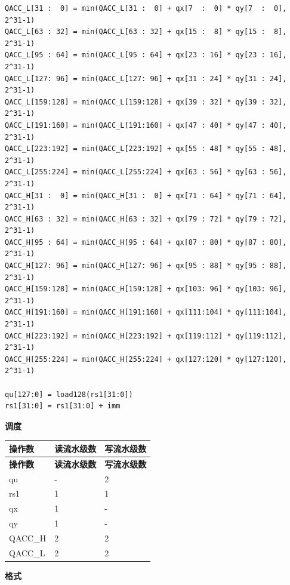 \begin{lstlisting}
QACC_L[31 :  0] = min(QACC_L[31 :  0] + qx[7  :  0] * qy[7  :  0], 2^31-1)
QACC_L[63 : 32] = min(QACC_L[63 : 32] + qx[15 :  8] * qy[15 :  8], 2^31-1)
QACC_L[95 : 64] = min(QACC_L[95 : 64] + qx[23 : 16] * qy[23 : 16], 2^31-1)
QACC_L[127: 96] = min(QACC_L[127: 96] + qx[31 : 24] * qy[31 : 24], 2^31-1)
QACC_L[159:128] = min(QACC_L[159:128] + qx[39 : 32] * qy[39 : 32], 2^31-1)
QACC_L[191:160] = min(QACC_L[191:160] + qx[47 : 40] * qy[47 : 40], 2^31-1)
QACC_L[223:192] = min(QACC_L[223:192] + qx[55 : 48] * qy[55 : 48], 2^31-1)
QACC_L[255:224] = min(QACC_L[255:224] + qx[63 : 56] * qy[63 : 56], 2^31-1)
QACC_H[31 :  0] = min(QACC_H[31 :  0] + qx[71 : 64] * qy[71 : 64], 2^31-1)
QACC_H[63 : 32] = min(QACC_H[63 : 32] + qx[79 : 72] * qy[79 : 72], 2^31-1)
QACC_H[95 : 64] = min(QACC_H[95 : 64] + qx[87 : 80] * qy[87 : 80], 2^31-1)
QACC_H[127: 96] = min(QACC_H[127: 96] + qx[95 : 88] * qy[95 : 88], 2^31-1)
QACC_H[159:128] = min(QACC_H[159:128] + qx[103: 96] * qy[103: 96], 2^31-1)
QACC_H[191:160] = min(QACC_H[191:160] + qx[111:104] * qy[111:104], 2^31-1)
QACC_H[223:192] = min(QACC_H[223:192] + qx[119:112] * qy[119:112], 2^31-1)
QACC_H[255:224] = min(QACC_H[255:224] + qx[127:120] * qy[127:120], 2^31-1)

qu[127:0] = load128(rs1[31:0])
rs1[31:0] = rs1[31:0] + imm
\end{lstlisting}

\textbf{调度}\\
\begin{longtable}[c]{|l|l|l|}
    \hline
    \rowcolor{lightgray}
    \textbf{操作数} & \textbf{读流水级数} & \textbf{写流水级数} \\\hline
    \endfirsthead
    \hline
    \rowcolor{lightgray}
     \textbf{操作数} & \textbf{读流水级数} & \textbf{写流水级数} \\\hline
    \endhead
    \hline
    \endfoot

    qu & - & 2 \\\hline
    rs1 & 1 & 1 \\\hline
     qx & 1 & - \\\hline
     qy & 1 & - \\\hline
     QACC\_H & 2 & 2 \\\hline
     QACC\_L & 2 & 2

\end{longtable}

\textbf{格式}\\

